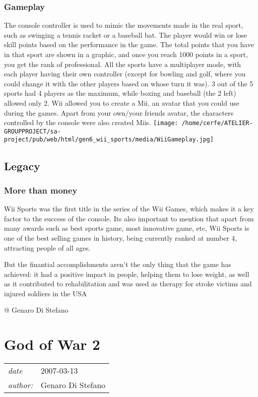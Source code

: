 \documentclass[a4paper,10pt]{book}
\newcommand{\pageHeader}[4]{
    \section{#1}
    \vspace{-0.3cm}
    \begin{table}[h!]
     \begin{tabular}{ll}
        \hline
        \textit{date} & #2 \\
        \textit{author: } & #3\\
        \hline
     \end{tabular}
    \end{table}
    \vspace{-0.3cm}
}
\begin{document}
 
 \subsubsection{Gameplay }
 
          The console controller is used to mimic the movements made in the real sport, such as swinging a tennis racket or a baseball bat. The player would win or lose skill points based on the performance in the game. The total points that you have in that sport are shown in a graphic, and once you reach 1000 points in a sport, you get the rank of professional.
All the sports have a multiplayer mode, with each player having their own controller (except for bowling and golf, where you could change it with the other players based on whose turn it was). 3 out of the 5 sports had 4 players as the maximum, while boxing and baseball (the 2 left) allowed only 2.  
          Wii allowed you to create a Mii, an avatar that you could use during the games. Apart from your own/your friends avatar, the characters controlled by the console were also created Miis.
          \texttt{[image: /home/cerfe/ATELIER-GROUPPROJECT/sa-project/pub/web/html/gen6\_wii\_sports/media/WiiGameplay.jpg]}
   
 \subsection{Legacy }
 \subsubsection{More than money }
 
           Wii Sports was the first title in the series of the Wii Games, which makes it a key factor to the success of the console. Its also important to mention that apart from many awards such as best sports game, most innovative game, etc, Wii Sports is one of the best selling games in history, being currently ranked at number 4, attracting people of all ages.
         
        But the finantial accomplishments aren't the only thing that the game has achieved: it had a positive impact in people, helping them to lose weight, as well as it contributed to rehabilitation and was used as therapy for stroke victims and injured soldiers in the USA
         
 
 
 
 
 @ Genaro Di Stefano 
 
 \newpage\pageHeader{God of War 2}{2007-03-13}{Genaro Di Stefano}{One of the best hack and slash in history}
\end{document}
